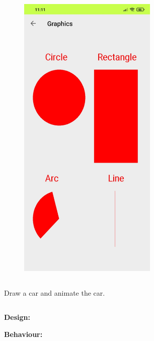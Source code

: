 \documentclass[12pt,letterpaper]{article}
\begin{document}
\subsection*{}
\begin{figure}[h]
    \centering
    \includegraphics[height=14cm, keepaspectratio]{Outputs/OP0.png}
\end{figure}

\newpage
\subsection*{}
\begin{flushleft}
    Draw a car and animate the car.
\end{flushleft}

\subsection*{}
\subsubsection*{}
\textbf{Design:}
\begin{flushleft}

\end{flushleft}
\textbf{Behaviour:}
\begin{flushleft}

\end{flushleft}
\end{document}
